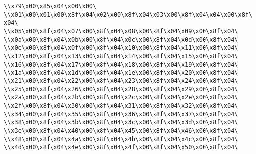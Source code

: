 \verb|\\x79\x00\x85\x04\x00\x00\|\newline
\verb|\\x01\x00\x01\x00\x8f\x04\x02\x00\x8f\x04\x03\x00\x8f\x04\x04\x00\x8f\x04\|\newline
\verb|\\x05\x00\x8f\x04\x07\x00\x8f\x04\x08\x00\x8f\x04\x09\x00\x8f\x04\|\newline
\verb|\\x0a\x00\x8f\x04\x0b\x00\x8f\x04\x0c\x00\x8f\x04\x0d\x00\x8f\x04\|\newline
\verb|\\x0e\x00\x8f\x04\x0f\x00\x8f\x04\x10\x00\x8f\x04\x11\x00\x8f\x04\|\newline
\verb|\\x12\x00\x8f\x04\x13\x00\x8f\x04\x14\x00\x8f\x04\x15\x00\x8f\x04\|\newline
\verb|\\x16\x00\x8f\x04\x17\x00\x8f\x04\x18\x00\x8f\x04\x19\x00\x8f\x04\|\newline
\verb|\\x1a\x00\x8f\x04\x1d\x00\x8f\x04\x1e\x00\x8f\x04\x20\x00\x8f\x04\|\newline
\verb|\\x21\x00\x8f\x04\x22\x00\x8f\x04\x23\x00\x8f\x04\x24\x00\x8f\x04\|\newline
\verb|\\x25\x00\x8f\x04\x26\x00\x8f\x04\x28\x00\x8f\x04\x29\x00\x8f\x04\|\newline
\verb|\\x2a\x00\x8f\x04\x2b\x00\x8f\x04\x2c\x00\x8f\x04\x2e\x00\x8f\x04\|\newline
\verb|\\x2f\x00\x8f\x04\x30\x00\x8f\x04\x31\x00\x8f\x04\x32\x00\x8f\x04\|\newline
\verb|\\x34\x00\x8f\x04\x35\x00\x8f\x04\x36\x00\x8f\x04\x37\x00\x8f\x04\|\newline
\verb|\\x38\x00\x8f\x04\x3b\x00\x8f\x04\x3c\x00\x8f\x04\x3d\x00\x8f\x04\|\newline
\verb|\\x3e\x00\x8f\x04\x40\x00\x8f\x04\x45\x00\x8f\x04\x46\x00\x8f\x04\|\newline
\verb|\\x48\x00\x8f\x04\x4a\x00\x8f\x04\x4b\x00\x8f\x04\x4c\x00\x8f\x04\|\newline
\verb|\\x4d\x00\x8f\x04\x4e\x00\x8f\x04\x4f\x00\x8f\x04\x50\x00\x8f\x04\|\newline
